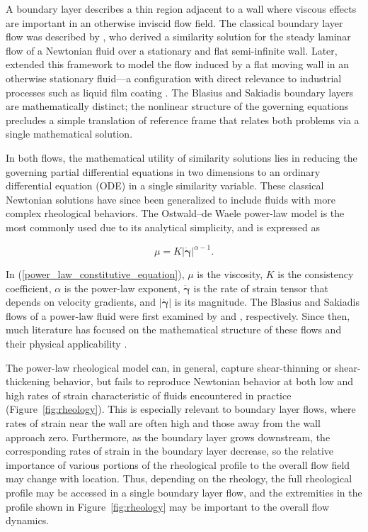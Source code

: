 \documentclass[lineno]{JFM-FLM_Au}
\newcommand{\gd}{{\dot{\bm{\gamma}}}}
\begin{document}
\hspace{\parindent} A boundary layer describes a thin region adjacent to a wall where viscous effects are important in an otherwise inviscid flow field. The classical boundary layer flow was described by \citet{Blasius}, who derived a similarity solution for the steady laminar flow of a Newtonian fluid over a stationary and flat semi-infinite wall. Later, \citet{Sakiadis1961a} extended this framework to model the flow induced by a flat moving wall in an otherwise stationary fluid---a configuration with direct relevance to industrial processes such as liquid film coating \citep{Weinstein2004, TDBlake1994}. The Blasius and Sakiadis boundary layers are mathematically distinct; the nonlinear structure of the governing equations precludes a simple translation of reference frame that relates both problems via a single mathematical solution.

In both flows, the mathematical utility of similarity solutions lies in reducing the governing partial differential equations in two dimensions to an ordinary differential equation (ODE) in a single similarity variable. These classical Newtonian solutions have since been generalized to include fluids with more complex rheological behaviors.  The Ostwald--de Waele power-law model is the most commonly used due to its analytical simplicity, and is expressed as

\begin{equation}
    \mu = K \left|\gd\right|^{\alpha-1}. \label{power_law_constitutive_equation}
\end{equation}


\noindent In (\ref{power_law_constitutive_equation}), $\mu$ is the viscosity, $K$ is the consistency coefficient, $\alpha$ is the power-law exponent, $\gd$ is the rate of strain tensor that depends on velocity gradients, and $|\gd|$ is its magnitude. The Blasius and Sakiadis flows of a power-law fluid were first examined by \citet{Acrivos1960} and \citet{Fox}, respectively. Since then, much literature has focused on the mathematical structure of these flows and their physical applicability \citep{Cortell, Takhar1991, And2007, Pant2004, CoatingFlows}.

The power-law rheological model can, in general, capture shear-thinning or shear-thickening behavior, but fails to reproduce Newtonian behavior at both low and high rates of strain characteristic of fluids encountered in practice (Figure~\ref{fig:rheology}). This is especially relevant to boundary layer flows, where rates of strain near the wall are often high and those away from the wall approach zero.  Furthermore, as the boundary layer grows downstream, the corresponding rates of strain in the boundary layer decrease, so the relative importance of various portions of the rheological profile to the overall flow field may change with location.  Thus, depending on the rheology, the full rheological profile may be accessed in a single boundary layer flow, and the extremities in the profile shown in Figure~\ref{fig:rheology} may be important to the overall flow dynamics.
\end{document}
